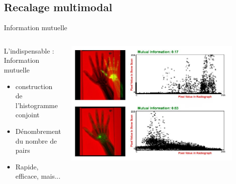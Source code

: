\documentclass{beamer}
\begin{document}
\subsection{Recalage multimodal}
\begin{frame}{Information mutuelle}
\centering
   \begin{columns}[c]
 \begin{column}{0.5\textwidth}
\begin{block}{L'indispensable : Information mutuelle}
\begin{itemize}
  \item construction de l'histogramme conjoint
  \item Dénombrement du nombre de pairs
  \item Rapide, efficace, mais...
  \end{itemize}
\end{block}
 \end{column}
 \begin{column}{0.5\textwidth}
 \centering
\includegraphics[width=0.9\textwidth]{images/histogramme_conjoint.jpg}\\
\end{column}
\end{columns}
 
\end{frame}
\end{document}
